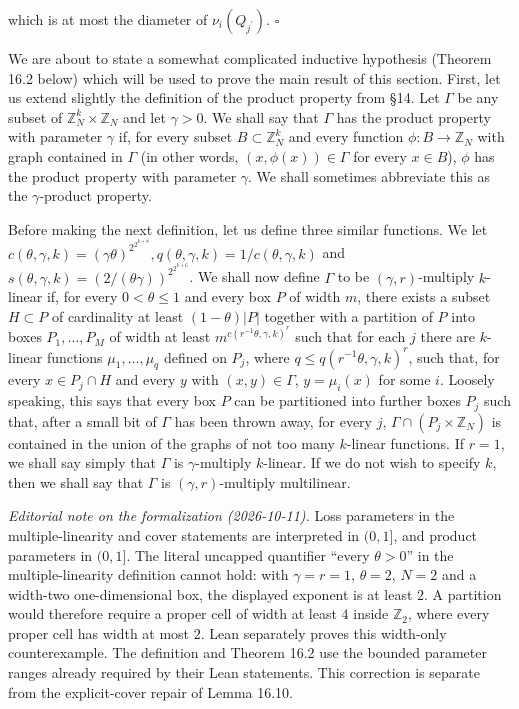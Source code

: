 \documentclass[10pt]{article}
\begin{document}
which is at most the diameter of $\nu_{i}\left(Q_{j^{\prime}}\right)$. \(\square\)

We are about to state a somewhat complicated inductive hypothesis (Theorem 16.2 below) which will be used to prove the main result of this section. First, let us extend slightly the definition of the product property from §14. Let $\Gamma$ be any subset of $\mathbb{Z}_{N}^{k} \times \mathbb{Z}_{N}$ and let $\gamma>0$. We shall say that $\Gamma$ has the product property with parameter $\gamma$ if, for every subset $B \subset \mathbb{Z}_{N}^{k}$ and every function $\phi: B \rightarrow \mathbb{Z}_{N}$ with graph contained in $\Gamma$ (in other words, $(x, \phi(x)) \in \Gamma$ for every $x \in B$), $\phi$ has the product property with parameter $\gamma$. We shall sometimes abbreviate this as the $\gamma$-product property.

Before making the next definition, let us define three similar functions. We let $c(\theta, \gamma, k)=(\gamma \theta)^{2^{2^{k+8}}}, q(\theta, \gamma, k)=1 / c(\theta, \gamma, k)$ and $s(\theta, \gamma, k)=(2 /(\theta \gamma))^{2^{2^{k+6}}}$. We shall now define $\Gamma$ to be $(\gamma, r)$-multiply $k$-linear if, for every $0<\theta\leqslant1$ and every box $P$ of width $m$, there exists a subset $H \subset P$ of cardinality at least $(1-\theta)|P|$ together with a partition of $P$ into boxes $P_{1}, \ldots, P_{M}$ of width at least $m^{c\left(r^{-1} \theta, \gamma, k\right)^{r}}$ such that for each $j$ there are $k$-linear functions $\mu_{1}, \ldots, \mu_{q}$ defined on $P_{j}$, where $q \leqslant q\left(r^{-1} \theta, \gamma, k\right)^{r}$, such that, for every $x \in P_{j} \cap H$ and every $y$ with $(x, y) \in \Gamma$, $y=\mu_{i}(x)$ for some $i$. Loosely speaking, this says that every box $P$ can be partitioned into further boxes $P_{j}$ such that, after a small bit of $\Gamma$ has been thrown away, for every $j$, $\Gamma \cap\left(P_{j} \times \mathbb{Z}_{N}\right)$ is contained in the union of the graphs of not too many $k$-linear functions. If $r=1$, we shall say simply that $\Gamma$ is $\gamma$-multiply $k$-linear. If we do not wish to specify $k$, then we shall say that $\Gamma$ is $(\gamma, r)$-multiply multilinear.

\emph{Editorial note on the formalization (2026-10-11).}
Loss parameters in the multiple-linearity and cover statements are interpreted
in $(0,1]$, and product parameters in $(0,1]$. The literal uncapped quantifier
``every $\theta>0$'' in the multiple-linearity definition cannot hold:
with $\gamma=r=1$, $\theta=2$, $N=2$ and a width-two one-dimensional box,
the displayed exponent is at least $2$. A partition would therefore require
a proper cell of width at least $4$ inside $\mathbb Z_2$, where every proper
cell has width at most $2$. Lean separately proves this width-only
counterexample. The definition and Theorem 16.2 use the bounded
parameter ranges already required by their Lean statements. This correction
is separate from the explicit-cover repair of Lemma 16.10.
\end{document}
